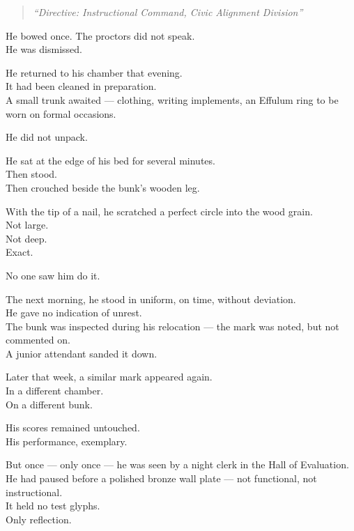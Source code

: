 \documentclass[12pt]{article}
\begin{document}
\begin{quote}
\textit{“Directive: Instructional Command, Civic Alignment Division”}
\end{quote}

He bowed once. The proctors did not speak.\\
He was dismissed.

\vspace{1em}

He returned to his chamber that evening.\\
It had been cleaned in preparation.\\
A small trunk awaited — clothing, writing implements, an Effulum ring to be worn on formal occasions.

He did not unpack.

He sat at the edge of his bed for several minutes.\\
Then stood.\\
Then crouched beside the bunk’s wooden leg.

With the tip of a nail, he scratched a perfect circle into the wood grain.\\
Not large.\\
Not deep.\\
Exact.

\vspace{1em}

No one saw him do it.

The next morning, he stood in uniform, on time, without deviation.\\
He gave no indication of unrest.\\
The bunk was inspected during his relocation — the mark was noted, but not commented on.\\
A junior attendant sanded it down.

Later that week, a similar mark appeared again.\\
In a different chamber.\\
On a different bunk.

\vspace{1em}

His scores remained untouched.\\
His performance, exemplary.

But once — only once — he was seen by a night clerk in the Hall of Evaluation.\\
He had paused before a polished bronze wall plate — not functional, not instructional.\\
It held no test glyphs.\\
Only reflection.
\end{document}
